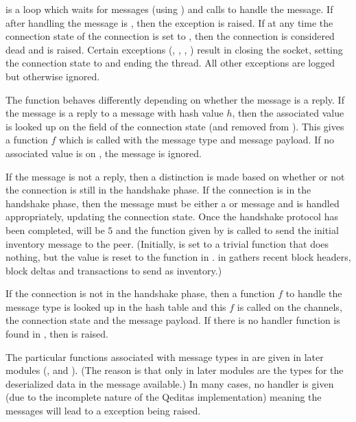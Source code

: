 {} is a loop which waits for messages (using {})
and calls {} to handle the message.
If after handling the message {} is {}, then the
exception {} is raised.
If at any time the connection state of the connection is set to {},
then the connection is considered dead and {} is raised.
Certain exceptions ({}, {}, {}, {})
result in closing the socket, setting the connection state to {} and ending the thread.
All other exceptions are logged but otherwise ignored.

The function {} behaves differently depending on whether the message is a reply.
If the message is a reply to a message with hash value $h$, then
the associated value is looked up on the {} field of the connection state
(and removed from {}).
This gives a function $f$ which is called with the message type and message payload.
If no associated value is on {}, the message is ignored.

If the message is not a reply, then a distinction is made based on whether or not the
connection is still in the handshake phase.
If the connection is in the handshake phase, then the message must be either a
{} or {} message
and is handled appropriately, updating the connection state.
Once the handshake protocol has been completed, {} will be $5$
and
the function given by {} is called to send the initial
inventory message to the peer.
(Initially, {} is set to a trivial function that does nothing,
but the value is reset to the {} function in {}.
{} in {} gathers recent block headers, block deltas and transactions
to send as inventory.)

If the connection is not in the handshake phase, then
a function $f$ to handle the message type is looked up in the hash table {}
and this $f$ is called on the channels, the connection state and the message payload.
If there is no handler function is found in {},
then {} is raised.

The particular functions associated with message types in {}
are given in later modules (,  and ). (The reason is that only in later modules are the types for
the deserialized data in the message available.)
In many cases, no handler is given (due to the incomplete nature of the Qeditas implementation)
meaning the messages will lead to a {} exception being raised.

